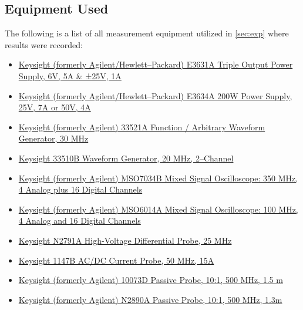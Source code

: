 \begin{appendices}
    \section{Equipment Used}
    The following is a list of all measurement equipment utilized in \cref{sec:exp} where results were recorded:
    \begin{itemize}
        \item \href{https://www.keysight.com/us/en/product/E3631A/80w-triple-output-power-supply-6v-5a--25v-1a.html}{Keysight (formerly Agilent/Hewlett--Packard) E3631A Triple Output Power Supply, 6V, 5A \& ±25V, 1A}
        \item \href{https://www.keysight.com/us/en/product/E3634A/200w-power-supply-25v-7a-50v-4a.html}{Keysight (formerly Agilent/Hewlett--Packard) E3634A 200W Power Supply, 25V, 7A or 50V, 4A}
        \item \href{https://www.keysight.com/us/en/product/33521A/function--arbitrary-waveform-generator-30-mhz.html}{Keysight (formerly Agilent) 33521A Function / Arbitrary Waveform Generator, 30 MHz}
        \item \href{https://www.keysight.com/us/en/product/33510B/waveform-generator-20-mhz-2-channel.html}{Keysight 33510B Waveform Generator, 20 MHz, 2--Channel}
        \item \href{https://www.keysight.com/us/en/product/MSO7034B/mixed-signal-oscilloscope-350mhz-4-analog-16-digital-channels.html}{Keysight (formerly Agilent) MSO7034B Mixed Signal Oscilloscope: 350 MHz, 4 Analog plus 16 Digital Channels}
        \item \href{https://www.keysight.com/us/en/product/MSO6014A/mixed-signal-oscilloscope-100-mhz-4-analog-16-digital-channels.html}{Keysight (formerly Agilent) MSO6014A Mixed Signal Oscilloscope: 100 MHz, 4 Analog and 16 Digital Channels}
        \item \href{https://www.keysight.com/us/en/product/N2791A/high-voltage-differential-probe-25-mhz.html}{Keysight N2791A High-Voltage Differential Probe, 25 MHz}
        \item \href{https://www.keysight.com/us/en/product/1147B/ac-dc-current-probe-50-mhz-15a.html}{Keysight 1147B AC/DC Current Probe, 50 MHz, 15A}
        \item \href{https://www.keysight.com/us/en/product/10073D/passive-probe-10-1-500-mhz-1-5-m.html}{Keysight (formerly Agilent) 10073D Passive Probe, 10:1, 500 MHz, 1.5 m}
        \item \href{https://www.keysight.com/us/en/product/N2890A/passive-probe-10-1-500mhz-1-3m.html}{Keysight (formerly Agilent) N2890A Passive Probe, 10:1, 500 MHz, 1.3m}

\end{itemize}
\end{appendices}
